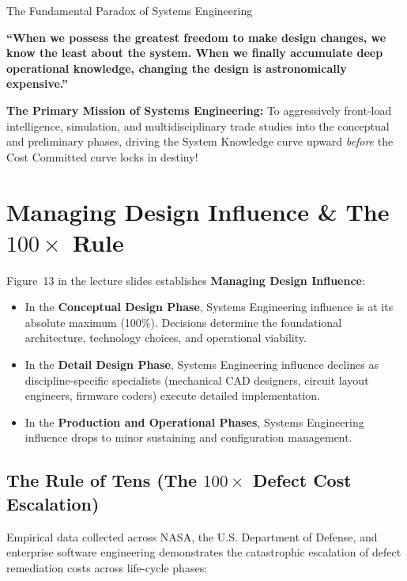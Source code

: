 \begin{takeawaybox}{The Fundamental Paradox of Systems Engineering}
\begin{center}
\textbf{\large ``When we possess the greatest freedom to make design changes, we know the least about the system. When we finally accumulate deep operational knowledge, changing the design is astronomically expensive.''}
\end{center}
\textbf{The Primary Mission of Systems Engineering:} To aggressively front-load intelligence, simulation, and multidisciplinary trade studies into the conceptual and preliminary phases, driving the System Knowledge curve upward \textit{before} the Cost Committed curve locks in destiny!
\end{takeawaybox}

\section{Managing Design Influence \& The \texorpdfstring{$100\times$}{100x} Rule}
\label{sec:design_influence}

Figure~13 in the lecture slides establishes \textbf{Managing Design Influence}:
\begin{itemize}[leftmargin=1.5em]
    \item In the \textbf{Conceptual Design Phase}, Systems Engineering influence is at its absolute maximum (100\%). Decisions determine the foundational architecture, technology choices, and operational viability.
    \item In the \textbf{Detail Design Phase}, Systems Engineering influence declines as discipline-specific specialists (mechanical CAD designers, circuit layout engineers, firmware coders) execute detailed implementation.
    \item In the \textbf{Production and Operational Phases}, Systems Engineering influence drops to minor sustaining and configuration management.
\end{itemize}

\subsection{The Rule of Tens (The \texorpdfstring{$100\times$}{100x} Defect Cost Escalation)}
Empirical data collected across NASA, the U.S. Department of Defense, and enterprise software engineering demonstrates the catastrophic escalation of defect remediation costs across life-cycle phases:


